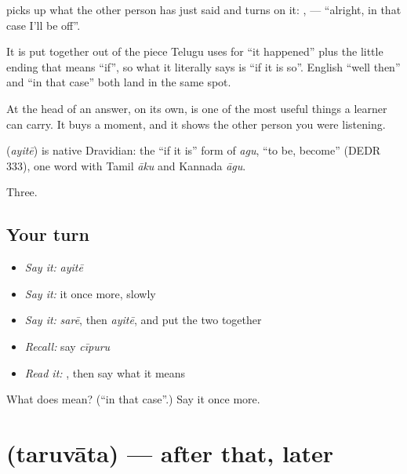  picks up what the other person has just said and turns on it: ,   — \textquotedblleft{}alright, in that case I'll be off\textquotedblright{}.

It is put together out of the piece Telugu uses for \textquotedblleft{}it happened\textquotedblright{} plus the little ending that means \textquotedblleft{}if\textquotedblright{}, so what it literally says is \textquotedblleft{}if it is so\textquotedblright{}. English \textquotedblleft{}well then\textquotedblright{} and \textquotedblleft{}in that case\textquotedblright{} both land in the same spot.

At the head of an answer, on its own,  is one of the most useful things a learner can carry. It buys a moment, and it shows the other person you were listening.

\begin{cousinweb}
\textbf{} (\emph{ayitē}) is native Dravidian: the \textquotedblleft{}if it is\textquotedblright{} form of \emph{agu}, \textquotedblleft{}to be, become\textquotedblright{} (DEDR 333), one word with Tamil \emph{āku} and Kannada \emph{āgu}.
\end{cousinweb}

\begin{grammarlens}[title={What you've built}]
Three.
\end{grammarlens}

\subsection*{Your turn}
\begin{itemize}
\raggedright
  \item \emph{Say it:} \emph{ayitē}
  \item \emph{Say it:} it once more, slowly
  \item \emph{Say it:} \emph{sarē}, then \emph{ayitē}, and put the two together
  \item \emph{Recall:} say \emph{cīpuru}
  \item \emph{Read it:} \textbf{}, then say what it means
\end{itemize}

\begin{tcolorbox}[breakable,colback=teal!4,colframe=teal!35!black,title={Before you move on}]
What does  mean? (\textquotedblleft{}in that case\textquotedblright{}.) Say it once more.
\end{tcolorbox}
\section[\texorpdfstring{\te{తరువాత} (taruvāta)}{తరువాత (taruvāta)}]{ (taruvāta) — after that, later}

